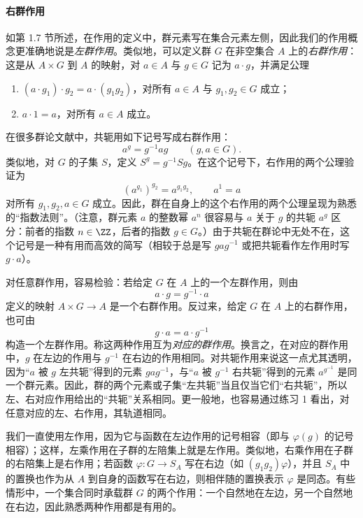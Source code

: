 \paragraph{右群作用}
如第 1.7 节所述，在作用的定义中，群元素写在集合元素左侧，因此我们的作用概念更准确地说是\emph{左群作用}。类似地，可以定义群 $G$ 在非空集合 $A$ 上的\emph{右群作用}：这是从 $A\times G$ 到 $A$ 的映射，对 $a\in A$ 与 $g\in G$ 记为 $a\cdot g$，并满足公理
\begin{enumerate}[label=(\arabic*)]
  \item $(a\cdot g_1)\cdot g_2=a\cdot(g_1g_2)$，对所有 $a\in A$ 与 $g_1,g_2\in G$ 成立；
  \item $a\cdot1=a$，对所有 $a\in A$ 成立。
\end{enumerate}

在很多群论文献中，共轭用如下记号写成右群作用：
\[
  a^g=g^{-1}ag\qquad(g,a\in G).
\]
类似地，对 $G$ 的子集 $S$，定义 $S^g=g^{-1}Sg$。在这个记号下，右作用的两个公理验证为
\[
  (a^{g_1})^{g_2}=a^{g_1g_2},
  \qquad a^1=a
\]
对所有 $g_1,g_2,a\in G$ 成立。因此，群在自身上的这个右作用的两个公理呈现为熟悉的“指数法则”。（注意，群元素 $a$ 的整数幂 $a^n$ 很容易与 $a$ 关于 $g$ 的共轭 $a^g$ 区分：前者的指数 $n\in\ZZ$，后者的指数 $g\in G$。）由于共轭在群论中无处不在，这个记号是一种有用而高效的简写（相较于总是写 $gag^{-1}$ 或把共轭看作左作用时写 $g\cdot a$）。

对任意群作用，容易检验：若给定 $G$ 在 $A$ 上的一个左群作用，则由
\[
  a\cdot g=g^{-1}\cdot a
\]
定义的映射 $A\times G\to A$ 是一个右群作用。反过来，给定 $G$ 在 $A$ 上的右群作用，也可由
\[
  g\cdot a=a\cdot g^{-1}
\]
构造一个左群作用。称这两种作用互为\emph{对应的群作用}。换言之，在对应的群作用中，$g$ 在左边的作用与 $g^{-1}$ 在右边的作用相同。对共轭作用来说这一点尤其透明，因为“$a$ 被 $g$ 左共轭”得到的元素 $gag^{-1}$，与“$a$ 被 $g^{-1}$ 右共轭”得到的元素 $a^{g^{-1}}$ 是同一个群元素。因此，群的两个元素或子集“左共轭”当且仅当它们“右共轭”，所以左、右对应作用给出的“共轭”关系相同。更一般地，也容易通过练习 1 看出，对任意对应的左、右作用，其轨道相同。

我们一直使用左作用，因为它与函数在左边作用的记号相容（即与 $\varphi(g)$ 的记号相容）；这样，左乘作用在子群的左陪集上就是左作用。类似地，右乘作用在子群的右陪集上是右作用；若函数 $\varphi:G\to S_A$ 写在右边（如 $(g_1g_2)\varphi$），并且 $S_A$ 中的置换也作为从 $A$ 到自身的函数写在右边，则相伴随的置换表示 $\varphi$ 是同态。有些情形中，一个集合同时承载群 $G$ 的两个作用：一个自然地在左边，另一个自然地在右边，因此熟悉两种作用都是有用的。

